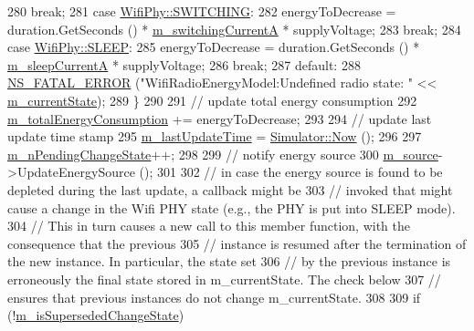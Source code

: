 \begin{DoxyCode}
280       \textcolor{keywordflow}{break};
281     \textcolor{keywordflow}{case} \hyperlink{classns3_1_1WifiPhy_af97408fa76f99797497b492758467143a2d51e3db3a961114a197a35838adeee5}{WifiPhy::SWITCHING}:
282       energyToDecrease = duration.GetSeconds () * \hyperlink{classns3_1_1WifiRadioEnergyModel_afb9d3996210a3d341070e9b08ca3609b}{m\_switchingCurrentA} * supplyVoltage;
283       \textcolor{keywordflow}{break};
284     \textcolor{keywordflow}{case} \hyperlink{classns3_1_1WifiPhy_af97408fa76f99797497b492758467143ad77ab37fb7a2710222a92a3b81d23b65}{WifiPhy::SLEEP}:
285       energyToDecrease = duration.GetSeconds () * \hyperlink{classns3_1_1WifiRadioEnergyModel_a42b305809982bb48a4c6ff3ca20614a4}{m\_sleepCurrentA} * supplyVoltage;
286       \textcolor{keywordflow}{break};
287     \textcolor{keywordflow}{default}:
288       \hyperlink{group__fatal_ga5131d5e3f75d7d4cbfd706ac456fdc85}{NS\_FATAL\_ERROR} (\textcolor{stringliteral}{"WifiRadioEnergyModel:Undefined radio state: "} << 
      \hyperlink{classns3_1_1WifiRadioEnergyModel_a3f7bc986f460d8d987a7104c71c952a4}{m\_currentState});
289     \}
290 
291   \textcolor{comment}{// update total energy consumption}
292   \hyperlink{classns3_1_1WifiRadioEnergyModel_a56ee62d581f8a6b3ebf466e97d028568}{m\_totalEnergyConsumption} += energyToDecrease;
293 
294   \textcolor{comment}{// update last update time stamp}
295   \hyperlink{classns3_1_1WifiRadioEnergyModel_a7ac51693b29b679aa09d76a3f78a231d}{m\_lastUpdateTime} = \hyperlink{classns3_1_1Simulator_ac3178fa975b419f7875e7105be122800}{Simulator::Now} ();
296 
297   \hyperlink{classns3_1_1WifiRadioEnergyModel_afbe1f543be97f42adf5ef9cefb36bd58}{m\_nPendingChangeState}++;
298 
299   \textcolor{comment}{// notify energy source}
300   \hyperlink{classns3_1_1WifiRadioEnergyModel_a4d8a626e91ba3c7b337df91071380d34}{m\_source}->UpdateEnergySource ();
301 
302   \textcolor{comment}{// in case the energy source is found to be depleted during the last update, a callback might be}
303   \textcolor{comment}{// invoked that might cause a change in the Wifi PHY state (e.g., the PHY is put into SLEEP mode).}
304   \textcolor{comment}{// This in turn causes a new call to this member function, with the consequence that the previous}
305   \textcolor{comment}{// instance is resumed after the termination of the new instance. In particular, the state set}
306   \textcolor{comment}{// by the previous instance is erroneously the final state stored in m\_currentState. The check below}
307   \textcolor{comment}{// ensures that previous instances do not change m\_currentState.}
308 
309   \textcolor{keywordflow}{if} (!\hyperlink{classns3_1_1WifiRadioEnergyModel_a5510491a9fe39122fb3e487ed6341aa0}{m\_isSupersededChangeState})

\end{DoxyCode}
